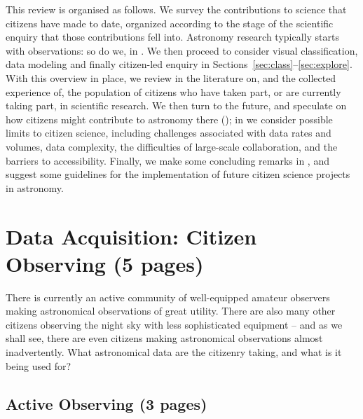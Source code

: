 \documentclass{ar2e}
\begin{document}
This review is organised as follows. We survey the contributions to science that
citizens have made to date, organized according to the stage of the scientific
enquiry that those contributions fell into. Astronomy research typically starts
with observations: so do we, in . We then proceed to consider 
visual classification, data modeling and finally citizen-led enquiry in 
Sections~\ref{sec:class}--\ref{sec:explore}. With this overview in place, we
review in  the literature on, and the collected experience of,
the population of citizens who have taken part, or are currently taking part, in
scientific research. We then turn to the future, and speculate on how citizens
might contribute to astronomy there (); in  
we consider possible limits to citizen science, including challenges associated
with data rates and volumes, data complexity, the difficulties of large-scale
collaboration, and the barriers to accessibility. Finally, we make some
concluding remarks in , and suggest some guidelines for
the implementation of future citizen science projects in astronomy.



\section{Data Acquisition: Citizen Observing (5 pages)}
\label{sec:obs}

There is currently an active community of well-equipped amateur observers making
astronomical observations of great utility. There are also many other citizens
observing the night sky with less sophisticated equipment -- and as we shall
see, there are even citizens making  astronomical observations almost
inadvertently. What astronomical data are the citizenry taking, and what is it
being used for?



\subsection{Active Observing (3 pages)}
\label{sec:obs:active}


\end{document}
